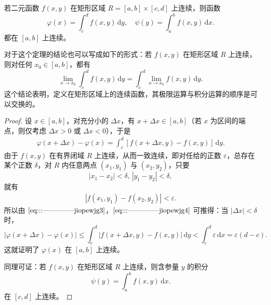 \documentclass[../../main.tex]{subfiles}%
\begin{document}
\begin{theorem}[连续性]\label{theorem:含参量积分的连续性}
若二元函数 \( f(x,y) \) 在矩形区域 \( R = [a,b] \times [c,d] \) 上连续，则函数
\[
\varphi(x) = \int_{c}^{d} f(x,y) \, \mathrm{d}y,\quad \psi(y) = \int_{a}^{b} f(x,y) \, \mathrm{d}x .
\]
都在 \( [a,b] \) 上连续。
\end{theorem}
\begin{remark}
对于这个定理的结论也可以写成如下的形式：若 \( f(x,y) \) 在矩形区域 \( R \) 上连续，则对任何 \( x_0 \in [a,b] \)，都有
\[
\lim_{x \to x_0} \int_{c}^{d} f(x,y) \, \mathrm{d}y = \int_{c}^{d} \lim_{x \to x_0} f(x,y) \, \mathrm{d}y.
\]
这个结论表明，定义在矩形区域上的连续函数，其极限运算与积分运算的顺序是可以交换的。
\end{remark}
\begin{proof}

设 \( x \in [a,b] \)，对充分小的 \( \Delta x \)，有 \( x + \Delta x \in [a,b] \)（若 \( x \) 为区间的端点，则仅考虑 \( \Delta x > 0 \) 或 \( \Delta x < 0 \)），于是
\begin{align}
\varphi(x + \Delta x) - \varphi(x) = \int_{c}^{d} [f(x + \Delta x,y) - f(x,y)] \, \mathrm{d}y. \label{eq:::--------------jiopewjg3}
\end{align}
由于 \( f(x,y) \) 在有界闭域 \( R \) 上连续，从而一致连续，即对任给的正数 \( \varepsilon \)，总存在某个正数 \( \delta \)，对 \( R \) 内任意两点 \( (x_1,y_1) \) 与 \( (x_2,y_2) \)，只要
\[
|x_1 - x_2| < \delta, \, |y_1 - y_2| < \delta,
\]
就有
\begin{align}
|f(x_1,y_1) - f(x_2,y_2)| < \varepsilon.\label{eq:::--------------jiopewjg4}
\end{align}
所以由 \(\eqref{eq:::--------------jiopewjg3}\)，\(\eqref{eq:::--------------jiopewjg4}\) 可推得：当 \( |\Delta x| < \delta \) 时，
\[
|\varphi(x + \Delta x) - \varphi(x)| \leqslant \int_{c}^{d} |f(x + \Delta x,y) - f(x,y)| \, \mathrm{d}y
< \int_{c}^{d} \varepsilon \, \mathrm{d}x = \varepsilon(d - c).
\]
这就证明了 \( \varphi(x) \) 在 \( [a,b] \) 上连续。

同理可证：若 \( f(x,y) \) 在矩形区域 \( R \) 上连续，则含参量 \( y \) 的积分
\[
\psi(y) = \int_{a}^{b} f(x,y) \, \mathrm{d}x .
\]
在 \( [c,d] \) 上连续。

\end{proof}
\end{document}

